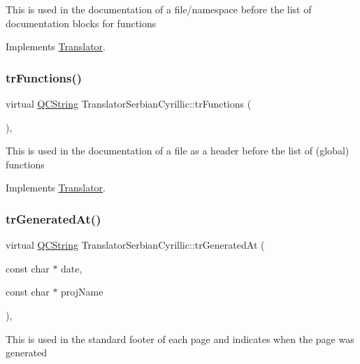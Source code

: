 This is used in the documentation of a file/namespace before the list of documentation blocks for functions 

Implements \mbox{\hyperlink{class_translator}{Translator}}.

\mbox{\label{class_translator_serbian_cyrillic_a1f0b8b32aaed2270bf454c4ee6c27e39}} 
\subsubsection{\texorpdfstring{trFunctions()}{trFunctions()}}
{\footnotesize\ttfamily virtual \mbox{\hyperlink{class_q_c_string}{Q\+C\+String}} Translator\+Serbian\+Cyrillic\+::tr\+Functions (\begin{DoxyParamCaption}{ }\end{DoxyParamCaption})\hspace{0.3cm}{\ttfamily [inline]}, {\ttfamily [virtual]}}

This is used in the documentation of a file as a header before the list of (global) functions 

Implements \mbox{\hyperlink{class_translator}{Translator}}.

\mbox{\label{class_translator_serbian_cyrillic_af449db58ef00e66120ddcac512f30078}} 
\subsubsection{\texorpdfstring{trGeneratedAt()}{trGeneratedAt()}}
{\footnotesize\ttfamily virtual \mbox{\hyperlink{class_q_c_string}{Q\+C\+String}} Translator\+Serbian\+Cyrillic\+::tr\+Generated\+At (\begin{DoxyParamCaption}\item[{const char $\ast$}]{date,  }\item[{const char $\ast$}]{proj\+Name }\end{DoxyParamCaption})\hspace{0.3cm}{\ttfamily [inline]}, {\ttfamily [virtual]}}

This is used in the standard footer of each page and indicates when the page was generated 

